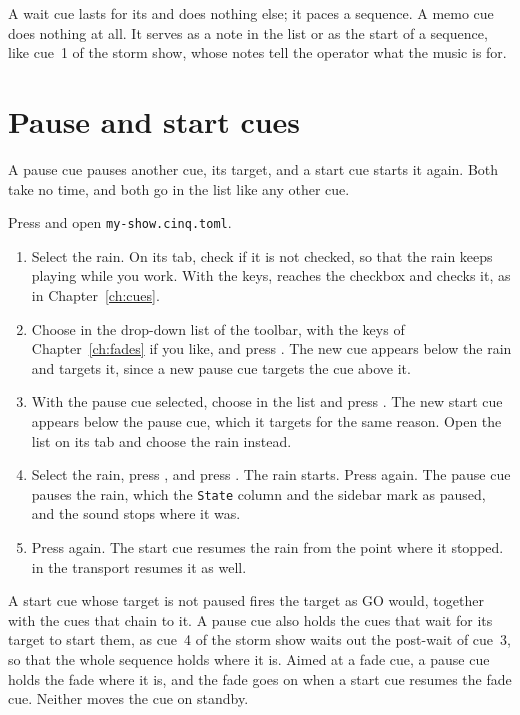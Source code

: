 A wait cue lasts for its  and does nothing else; it paces a
sequence.  A memo cue does nothing at all.  It serves as a note in the list
or as the start of a sequence, like cue~1 of the storm show, whose notes tell
the operator what the music is for.

\section{Pause and start cues}

A pause cue pauses another cue, its target, and a start cue starts it again.
Both take no time, and both go in the list like any other cue.

Press  and open \texttt{my-show.cinq.toml}.

\begin{enumerate}
\item Select the rain.  On its  tab, check  if it is not checked, so that the rain keeps playing
  while you work.  With the keys,  reaches the checkbox and
   checks it, as in Chapter~\ref{ch:cues}.
\item Choose  in the  drop-down list of the toolbar,
  with the keys of Chapter~\ref{ch:fades} if you like, and press
  \@.  The new cue appears below the rain and targets it, since a
  new pause cue targets the cue above it.
\item With the pause cue selected, choose  in the  list
  and press \@.  The new start cue appears below the pause cue,
  which it targets for the same reason.  Open the  list on its
   tab and choose the rain instead.
\item Select the rain, press , and press \@.  The
  rain starts.  Press  again.  The pause cue pauses the rain, which
  the \texttt{State} column and the sidebar mark as paused, and the sound
  stops where it was.
\item Press  again.  The start cue resumes the rain from the point
  where it stopped.   in the transport resumes it as well.
\end{enumerate}

A start cue whose target is not paused fires the target as GO would, together
with the cues that chain to it.  A pause cue also holds the cues that wait
for its target to start them, as cue~4 of the storm show waits out the
post-wait of cue~3, so that the whole sequence holds where it is.  Aimed at a
fade cue, a pause cue holds the fade where it is, and the fade goes on when a
start cue resumes the fade cue.  Neither moves the cue on standby.

